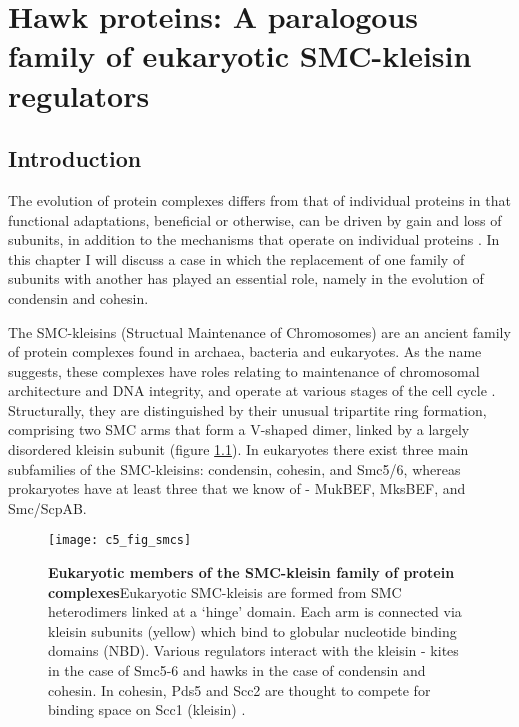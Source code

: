 \documentclass[a4paper,11pt,twoside,openright]{scrbook}
\begin{document}
\chapter{Hawk proteins: A paralogous family of eukaryotic SMC-kleisin regulators} \label{chapter:hawks}


\section{Introduction}
The evolution of protein complexes differs from that of individual proteins in that functional adaptations, beneficial or otherwise, can be driven by gain and loss of subunits, in addition to the mechanisms that operate on individual proteins \cite{Gabaldon2005,Huynen2013,Marsh2015}. In this chapter I will discuss a case in which the replacement of one family of subunits with another has played an essential role, namely in the evolution of condensin and cohesin.

The SMC-kleisins (Structual Maintenance of Chromosomes) are an ancient family of protein complexes found in archaea, bacteria and eukaryotes. As the name suggests, these complexes have roles relating to maintenance of chromosomal architecture and DNA integrity, and operate at various stages of the cell cycle \cite{Nasmyth2009, Hirano2016}. Structurally, they are distinguished by their unusual tripartite ring formation, comprising two SMC arms that form a V-shaped dimer, linked by a largely disordered kleisin subunit (figure \ref{figure:smcs}). In eukaryotes there exist three main subfamilies of the SMC-kleisins: condensin, cohesin, and Smc5/6, whereas prokaryotes have at least three that we know of - MukBEF, MksBEF, and Smc/ScpAB.

\begin{figure}[h]
\fcapsideright
    {\caption[Eukaryotic members of the SMC-kleisin family of protein complexes]{\sffamily\textbf{Eukaryotic members of the SMC-kleisin family of protein complexes}\newline \small Eukaryotic SMC-kleisis are formed from SMC heterodimers linked at a `hinge' domain. Each arm is connected via kleisin subunits (yellow) which bind to globular nucleotide binding domains (NBD). Various regulators interact with the kleisin - kites in the case of Smc5-6 and hawks in the case of condensin and cohesin. In cohesin, Pds5 and Scc2 are thought to compete for binding space on Scc1 (kleisin) \cite{Kikuchi2016}.}\label{figure:smcs}}
    {\texttt{[image: c5\_fig\_smcs]}}
\end{figure}
\end{document}
